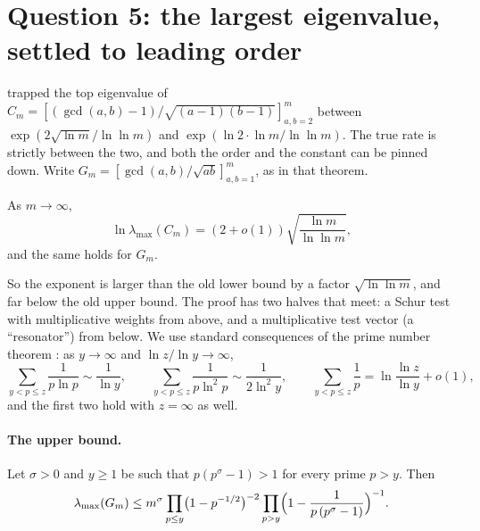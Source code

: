 \section{Question 5: the largest eigenvalue, settled to leading order}\label{sec:th-top}
\addednote{\revC}

 trapped the top eigenvalue of $C_m = [(\gcd(a,b)-1)/\sqrt{(a-1)(b-1)}]_{a,b=2}^m$ between $\exp(2\sqrt{\ln m}/\ln\ln m)$ and $\exp(\ln 2\cdot\ln m/\ln\ln m)$. The true rate is strictly between the two, and both the order and the constant can be pinned down. Write $G_m = [\gcd(a,b)/\sqrt{ab}]_{a,b=1}^m$, as in that theorem.

\begin{theorem}\label{thm:th-top}
As $m \to \infty$,
\[
  \ln\lambda_{\max}(C_m) = (2 + o(1))\sqrt{\frac{\ln m}{\ln\ln m}},
\]
and the same holds for $G_m$.
\end{theorem}

So the exponent is larger than the old lower bound by a factor $\sqrt{\ln\ln m}$, and far below the old upper bound. The proof has two halves that meet: a Schur test with multiplicative weights from above, and a multiplicative test vector (a ``resonator'') from below. We use standard consequences of the prime number theorem \citep[Ch.~XXII]{HardyWright2008}: as $y \to \infty$ and $\ln z/\ln y \to \infty$,
\begin{equation}\label{eq:th-pnt}
  \sum_{y < p \le z}\frac{1}{p\ln p} \sim \frac{1}{\ln y}, \qquad \sum_{y < p \le z}\frac{1}{p\ln^2 p} \sim \frac{1}{2\ln^2 y}, \qquad \sum_{y < p \le z}\frac1p = \ln\frac{\ln z}{\ln y} + o(1),
\end{equation}
and the first two hold with $z = \infty$ as well.

\paragraph{The upper bound.}

\begin{lemma}\label{lem:th-upper}
Let $\sigma > 0$ and $y \ge 1$ be such that $p(p^\sigma - 1) > 1$ for every prime $p > y$. Then
\[
  \lambda_{\max}(G_m) \le m^\sigma\prod_{p \le y}\bigl(1 - p^{-1/2}\bigr)^{-2}\prod_{p > y}\Bigl(1 - \frac{1}{p\,(p^\sigma - 1)}\Bigr)^{-1}.
\]
\end{lemma}

